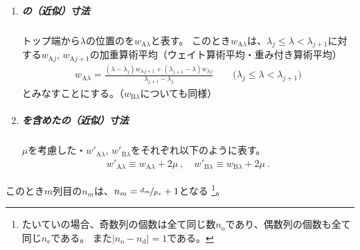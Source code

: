 \begin{tcolorbox}[title={\expandafterindex{ひょうき（\yomiDimple）@表記（\nameDimple）}\nameDimple に関する表記法}, fonttitle=\gtfamily\bfseries, breakable, enhanced jigsaw]
\begin{enumerate}[label=\sarrow]
\item
\subparagraph*{\InnerDiameter の（近似）寸法}
トップ端から$\lambda$の位置の\ACID を$w_{\mathrm A\lambda}$と表す。
このとき$w_{\mathrm A\lambda}$は、$\lambda_j \leq \lambda < \lambda_{j+1}$に対する$w_{\mathrm Aj}$, $w_{\mathrm Aj+1}$の加重算術平均（ウェイト算術平均・重み付き算術平均）
\begin{align*}
  w_{\mathrm A\lambda}
  = \frac{(\lambda-\lambda_j)w_{\mathrm Aj+1}+(\lambda_{j+1}-\lambda)w_{\mathrm Aj}}{\lambda_{j+1}-\lambda_j}
  \qquad
  \Big(\lambda_j \leq \lambda < \lambda_{j+1}\Big)
\end{align*}
とみなすことにする。（$w_{\mathrm B\lambda}$についても同様）

\item
\subparagraph*{\PlatingThk を含めた\InnerDiameter の（近似）寸法}
\PlatingThk$\mu$を考慮した\ACID・\BDID$w'_{\mathrm A\lambda}$, $w'_{\mathrm B\lambda}$をそれぞれ以下のように表す。
\begin{align*}
  w'_{\mathrm A\lambda} \equiv w_{\mathrm A\lambda}+2\mu~, \quad
  w'_{\mathrm B\lambda} \equiv w_{\mathrm B\lambda}+2\mu~.
\end{align*}
\end{enumerate}
\end{tcolorbox}\noindent
このとき$m$列目の\DimpleNum$n_m$は、$n_m = \nicefrac{d_m}{p_x}+1$となる
\footnote{\label{fn:generallyDimpleN}%
たいていの場合、奇数列の個数は全て同じ数$n_\mathrm o$であり、偶数列の個数も全て同じ$n_\mathrm e$である。
また$|n_\mathrm o-n_\mathrm d| = 1$である。}。
